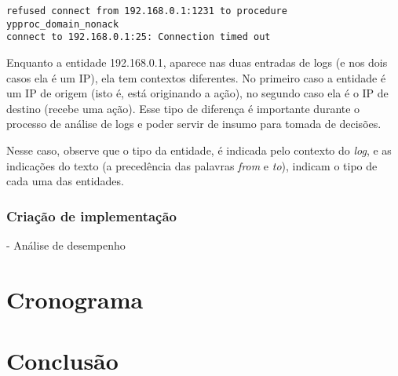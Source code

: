 \documentclass[
	12pt,				%
	openright,			%
	twoside,			%
	a4paper,			%
	english,			%
	french,				%
	spanish,			%
	brazil,				%
	]{abntex2}
\begin{document}
{\tiny
\begin{verbatim}
refused connect from 192.168.0.1:1231 to procedure ypproc_domain_nonack 
connect to 192.168.0.1:25: Connection timed out
\end{verbatim}
}

Enquanto a entidade 192.168.0.1, aparece nas duas entradas de logs (e nos dois casos ela é um IP), ela tem contextos diferentes. No primeiro caso a entidade é um IP de origem (isto é, está originando a ação), no segundo caso ela é o IP de destino (recebe uma ação). Esse tipo de diferença é importante durante o processo de análise de logs e poder servir de insumo para tomada de decisões.

Nesse caso, observe que o tipo da entidade, é indicada pelo contexto do \emph{log}, e as indicações do texto (a precedência das palavras \emph{from} e \emph{to}), indicam o tipo de cada uma das entidades.

\cite{bird2009natural}

\subsection{Criação de implementação}

- Análise de desempenho

\chapter{Cronograma}\label{chap:cronograma}

\chapter{Conclusão}\label{chap:conclusao}


\postextual


\end{document}
